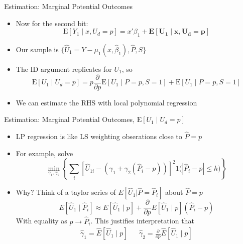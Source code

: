 \documentclass{beamer}
\begin{document}
\begin{frame}{Estimation:  Marginal Potential Outcomes }
  \begin{itemize}
  \item Now for the second bit: \begin{equation*}
      \mathrm{E}[Y_1\mid x,U_d=p]  = x'\beta_1 +  \mathbf{\mathrm{\mathbf{E}}[U_1\mid x,U_d=p]}
    \end{equation*}
\item Our sample is $\{\hat{U}_1= Y-\mu_1(x,\hat{\beta}_1), \hat{P},
  S\}$
\item The ID argument replicates for $U_1$, so
\begin{equation*}
  \mathrm{E}[U_1\mid U_d= p] = p \frac{\partial}{\partial
    p}\mathrm{E}[U_1\mid P=p,S=1] + \mathrm{E}[U_1\mid P=p,S=1]
\end{equation*}
\item We can estimate the RHS with local polynomial regression
  \end{itemize}

\end{frame}

\begin{frame}{Estimation:  Marginal Potential Outcomes,
    $\mathrm{E}[U_1\mid U_d=p]$}
    \begin{itemize}
  \item LP regression is like LS weighting obserations close to $\hat{P}=p$
\item For example, solve
  \begin{equation*}
   \min_{\gamma_1,\gamma_2} \left\{ \sum_i\left[\hat{U}_{1i}-(\gamma_1 +
      \gamma_2(\hat{P}_i-p))\right]^2\mathrm{1}{\bigl(|\hat{P}_i - p| \le h\bigr)}\right\}
  \end{equation*}
\item Why? Think of a taylor series of $E[\hat{U}_{1}|
 \hat{P}=\hat{P}_i]$
  about $\hat{P} = p$
  \begin{equation*}
    E[\hat{U}_{1}\mid \hat{P}_i] \approx E[\hat{U}_{1}\mid p] +
    \frac{\partial}{\partial p} E[\hat{U}_{1}\mid p] (\hat{P}_i-p)
  \end{equation*}
With equality as $p \rightarrow \hat{P}_i$. This justifies
interpretation that
\begin{eqnarray*}
  \hat{\gamma}_1 = \hat{E}[\hat{U}_{1}\mid p] & & \hat{\gamma}_2 = \frac{\partial}{\partial p} \hat{E}[\hat{U}_{1}\mid p]
\end{eqnarray*}
  \end{itemize}
\end{frame}
\end{document}
